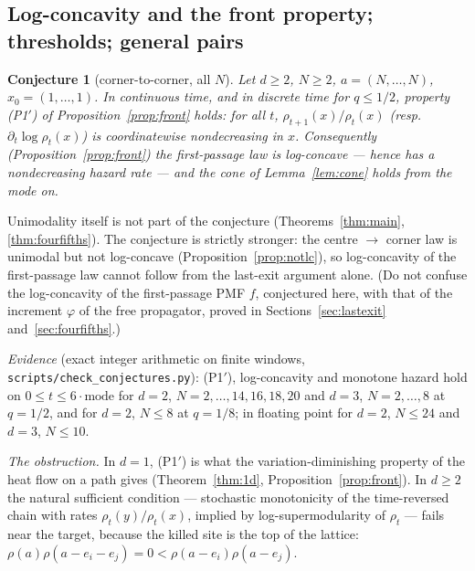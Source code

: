 \documentclass[11pt,a4paper]{article}
\newtheorem{conjecture}[theorem]{Conjecture}
\theoremstyle{definition}
\begin{document}
\subsection{Log-concavity and the front property; thresholds; general pairs}\label{sec:openshape}

\begin{conjecture}[corner-to-corner, all $N$]\label{conj:main}
Let $d\ge2$, $N\ge2$, $a=(N,\dots,N)$, $x_0=(1,\dots,1)$. In continuous time, and in discrete time for $q\le1/2$, property (P1$'$) of Proposition~\ref{prop:front} holds: for all $t$, $\rho_{t+1}(x)/\rho_t(x)$ (resp.\ $\partial_t\log\rho_t(x)$) is coordinatewise nondecreasing in $x$. Consequently (Proposition~\ref{prop:front}) the first-passage law is log-concave --- hence has a nondecreasing hazard rate --- and the cone of Lemma~\ref{lem:cone} holds from the mode on.
\end{conjecture}
Unimodality itself is not part of the conjecture (Theorems~\ref{thm:main}, \ref{thm:fourfifths}). The conjecture is strictly stronger: the centre $\to$ corner law is unimodal but not log-concave (Proposition~\ref{prop:notlc}), so log-concavity of the first-passage law cannot follow from the last-exit argument alone. (Do not confuse the log-concavity of the first-passage PMF $f$, conjectured here, with that of the increment $\varphi$ of the free propagator, proved in Sections~\ref{sec:lastexit} and~\ref{sec:fourfifths}.)

\emph{Evidence} (exact integer arithmetic on finite windows, \texttt{scripts/check\_conjectures.py}): (P1$'$), log-concavity and monotone hazard hold on $0\le t\le6\cdot\text{mode}$ for $d=2$, $N=2,\dots,14,16,18,20$ and $d=3$, $N=2,\dots,8$ at $q=1/2$, and for $d=2$, $N\le8$ at $q=1/8$; in floating point for $d=2$, $N\le24$ and $d=3$, $N\le10$.

\emph{The obstruction.} In $d=1$, (P1$'$) is what the variation-diminishing property of the heat flow on a path gives (Theorem~\ref{thm:1d}, Proposition~\ref{prop:front}). In $d\ge2$ the natural sufficient condition --- stochastic monotonicity of the time-reversed chain with rates $\rho_t(y)/\rho_t(x)$, implied by log-supermodularity of $\rho_t$ --- fails near the target, because the killed site is the top of the lattice: $\rho(a)\rho(a-e_i-e_j)=0<\rho(a-e_i)\rho(a-e_j)$.
\end{document}
